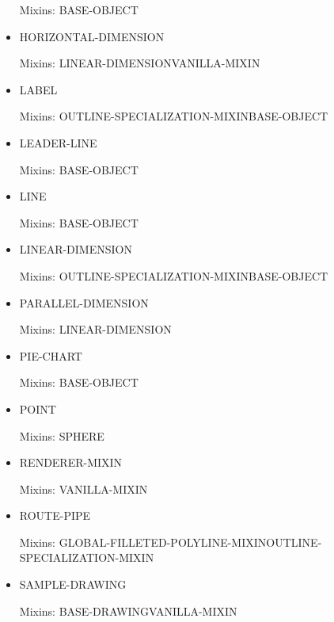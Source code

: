 \documentclass [11pt]{book}
\begin{document}
\begin{itemize}
Mixins: BASE-OBJECT



\item {}HORIZONTAL-DIMENSION

Mixins: LINEAR-DIMENSIONVANILLA-MIXIN



\item {}LABEL

Mixins: OUTLINE-SPECIALIZATION-MIXINBASE-OBJECT



\item {}LEADER-LINE

Mixins: BASE-OBJECT



\item {}LINE

Mixins: BASE-OBJECT



\item {}LINEAR-DIMENSION

Mixins: OUTLINE-SPECIALIZATION-MIXINBASE-OBJECT



\item {}PARALLEL-DIMENSION

Mixins: LINEAR-DIMENSION



\item {}PIE-CHART

Mixins: BASE-OBJECT



\item {}POINT

Mixins: SPHERE



\item {}RENDERER-MIXIN

Mixins: VANILLA-MIXIN



\item {}ROUTE-PIPE

Mixins: GLOBAL-FILLETED-POLYLINE-MIXINOUTLINE-SPECIALIZATION-MIXIN



\item {}SAMPLE-DRAWING

Mixins: BASE-DRAWINGVANILLA-MIXIN




\end{itemize}
\end{document}

